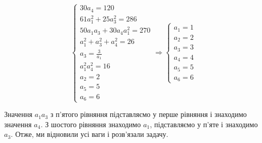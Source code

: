 \begin{equation*}
    \begin{cases}
30a_4 = 120\\
61a_1^2+25a_3^2 = 286\\
50a_1a_3 + 30a_4a_1^2 = 270\\
a_1^2+a_3^2+a_4^2 = 26\\
a_3 = \frac{3}{a_1}\\
a_1^2a_4^2 = 16\\
a_2 = 2\\
a_5 = 5\\
a_6 = 6
\end{cases}
\Rightarrow
\begin{cases}
a_1 = 1\\
a_2 = 2\\
a_3 = 3\\
a_4 = 4\\
a_5 = 5\\
a_6 = 6
\end{cases}
\end{equation*}

Значення $a_1a_3$ з п'ятого рівняння підставляємо у перше рівняння і знаходимо значення $a_4$. З шостого рівняння знаходимо $a_1$, підставляємо у п'яте і знаходимо $a_3$. Отже, ми відновили усі ваги і розв'язали задачу.


